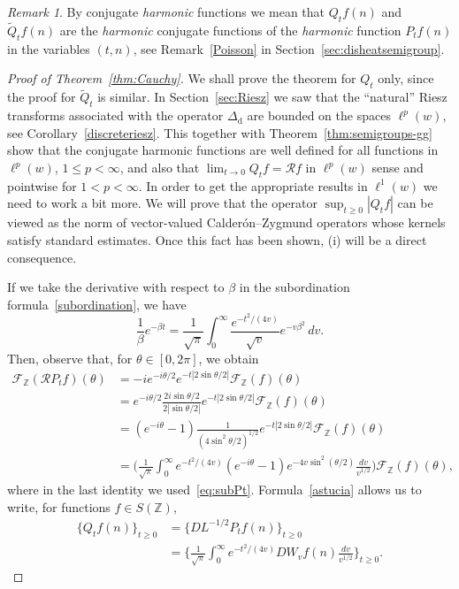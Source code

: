 \documentclass[11pt]{amsart}
\numberwithin{equation}{section}
\newcommand{\Z}{\mathbb{Z}}
\newcommand{\dis}{\mathrm{d}}
\theoremstyle{plain}
\theoremstyle{remark}
\newtheorem{rem}{Remark}
\begin{document}
\begin{rem}
By conjugate \textit{harmonic} functions we mean that $Q_tf(n)$ and $\widetilde{Q}_tf(n)$ are the \textit{harmonic} conjugate functions of the \textit{harmonic} function $P_tf(n)$ in the variables $(t,n)$, see Remark~\ref{Poisson} in Section~\ref{sec:disheatsemigroup}.
\end{rem}

\begin{proof}[Proof of Theorem~\ref{thm:Cauchy}]
We shall prove the theorem for $Q_t$ only, since the proof for $\widetilde{Q}_t$ is similar.
In Section~\ref{sec:Riesz} we saw that the ``natural'' Riesz transforms associated with the operator $\Delta_{\dis}$  are bounded on the spaces $\ell^p(w)$, see Corollary~\ref{discreteriesz}.
This together with Theorem~\ref{thm:semigroups-gg} show that the conjugate harmonic functions are well defined for all  functions in $\ell^p(w)$, $1 \le p < \infty$, and also that
$\lim_{t\to 0} Q_tf = \mathcal{R}f $ in $\ell^p(w)$ sense and pointwise for  $1 < p< \infty.$ In order to get the appropriate results in $\ell^1(w)$ we need to work a bit more. We will prove that the operator $\sup_{t\ge0} |Q_tf|$ can be viewed as the norm of vector-valued Calder\'on--Zygmund operators whose kernels satisfy standard estimates. Once this fact has been shown, (i) will be a direct consequence.

If we take the derivative
with respect to $\beta$ in the subordination formula~\eqref{subordination}, we have
\begin{equation}
\label{eq:subPt}
\frac1{\beta} e^{-\beta t} = \frac1{\sqrt{\pi}}
\int_0^\infty \frac{e^{-t^2/(4v)}}{\sqrt{v}} e^{-v\beta^2} \,dv.
\end{equation}
Then, observe that, for $\theta \in [0,2\pi]$, we obtain
\begin{align}
\label{astucia}
\nonumber
\mathcal{F}_{\Z}(\mathcal{R} P_tf)(\theta)
&= -ie^{-i\theta/2} e^{-t|2\sin \theta/2|}  \mathcal{F}_{\Z}(f)(\theta)\\
& \nonumber =
e^{-i\theta/2} \frac{2i \sin\theta/2}{2|\sin\theta/2|} e^{-t|2\sin \theta/2|} \mathcal{F}_{\Z}(f)(\theta) \\
&= (e^{-i\theta}-1) \frac{1} {(4\sin^2\theta/2)^{1/2} } e^{-t|2\sin \theta/2|} \mathcal{F}_{\Z}(f)(\theta) \\
&= \nonumber
\Big( \frac1{\sqrt{\pi}} \int_0^\infty e^{-t^2/(4v)} (e^{-i\theta}-1)
e^{-4v\sin^2(\theta/2)}\frac{dv}{v^{1/2}}\Big)  \mathcal{F}_{\Z}(f)(\theta),
\end{align}
where in the last identity we used~\eqref{eq:subPt}.
Formula~\eqref{astucia} allows us to write, for functions $f\in S(\Z),$
\begin{equation}
\label{subordinationQ}
\begin{aligned}
\{ Q_tf(n) \}_{t\ge0} &= \{ D L^{-1/2} P_t f(n) \}_{t\ge0}  \\
&= \Big\{ \frac1{\sqrt{\pi}} \int_0^\infty e^{-t^2/(4v)} DW_vf(n) \frac{dv}{v^{1/2}} \Big\}_{t\ge0}.
\end{aligned}
\end{equation}


\end{proof}
\end{document}

